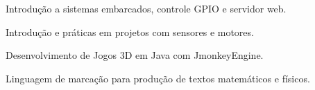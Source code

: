 
{Introdução a sistemas embarcados, controle GPIO e servidor web.}{}

{Introdução e práticas em projetos com sensores e motores.}{}

{Desenvolvimento de Jogos 3D em Java com JmonkeyEngine.}{}

{Linguagem de marcação para produção de textos matemáticos e físicos.}{}

